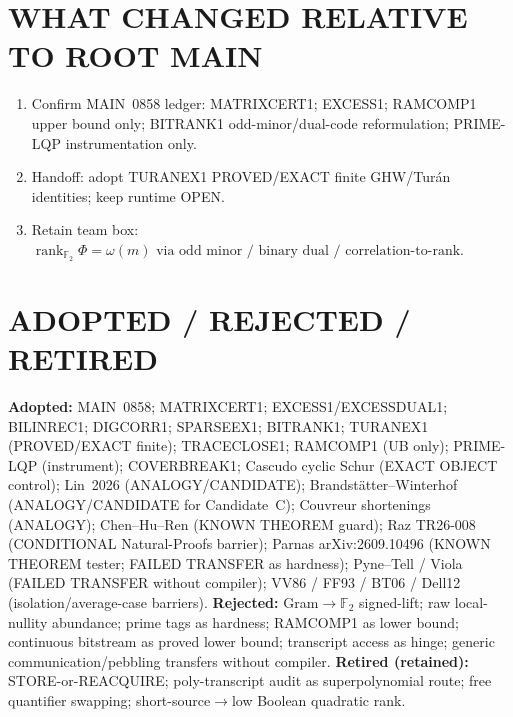 \documentclass[11pt]{article}
\begin{document}
\section*{WHAT CHANGED RELATIVE TO ROOT MAIN}
\begin{enumerate}
\item Confirm MAIN~0858 ledger: MATRIXCERT1; EXCESS1; RAMCOMP1 upper bound only; BITRANK1
odd-minor/dual-code reformulation; PRIME-LQP instrumentation only.
\item Handoff: adopt TURANEX1 PROVED/EXACT finite GHW/Tur\'an identities; keep runtime OPEN.
\item Retain team box:
$\boxed{\operatorname{rank}_{\mathbb F_2}\Phi=\omega(m)\text{ via odd minor / binary dual / correlation-to-rank}.}$
\end{enumerate}

\section*{ADOPTED / REJECTED / RETIRED}
\textbf{Adopted:} MAIN~0858; MATRIXCERT1; EXCESS1/EXCESSDUAL1; BILINREC1; DIGCORR1; SPARSEEX1;
BITRANK1; TURANEX1 (PROVED/EXACT finite); TRACECLOSE1; RAMCOMP1 (UB only); PRIME-LQP (instrument);
COVERBREAK1; Cascudo cyclic Schur (EXACT OBJECT control); Lin~2026 (ANALOGY/CANDIDATE);
Brandst\"atter--Winterhof (ANALOGY/CANDIDATE for Candidate~C); Couvreur shortenings (ANALOGY);
Chen--Hu--Ren (KNOWN THEOREM guard); Raz TR26-008 (CONDITIONAL Natural-Proofs barrier);
Parnas arXiv:2609.10496 (KNOWN THEOREM tester; FAILED TRANSFER as hardness); Pyne--Tell /
Viola (FAILED TRANSFER without compiler); VV86 / FF93 / BT06 / Dell12 (isolation/average-case barriers).
\textbf{Rejected:} Gram$\to\mathbb F_2$ signed-lift; raw local-nullity abundance; prime tags as hardness;
RAMCOMP1 as lower bound; continuous bitstream as proved lower bound; transcript access as hinge;
generic communication/pebbling transfers without compiler.
\textbf{Retired (retained):} STORE-or-REACQUIRE; poly-transcript audit as superpolynomial route;
free quantifier swapping; short-source$\to$low Boolean quadratic rank.
\end{document}
